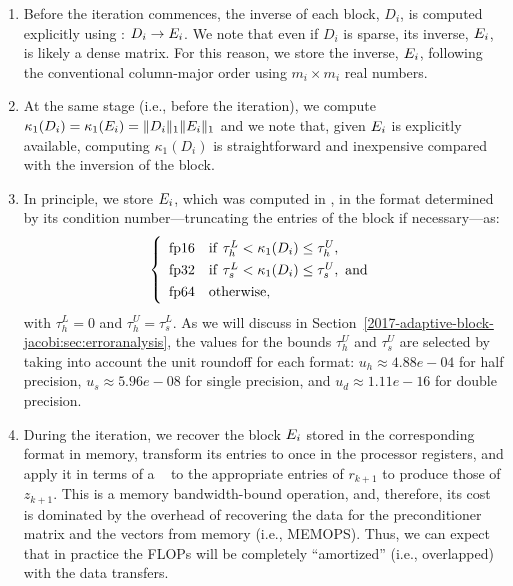 \begin{enumerate} 
	\item Before the iteration
	commences, the inverse of each block, $D_i$, is computed explicitly using 
	\fpd: 
	$D_i \rightarrow E_i$. We note that even if $D_i$ is
	sparse, its inverse, $E_i$, is likely a dense matrix. For this reason, we 
	store
	the inverse, $E_i$, following the conventional column-major order using
	$m_i\times m_i$ real numbers. 
	\item At the same stage (i.e., before the
	iteration),
	we compute $\kappa_1(D_i) = \kappa_1(E_i) =  \|D_{i}\|_1 \|E_{i}\|_1$
        and we note
	that, given $E_i$ is explicitly available, computing
	$\kappa_1(D_i)$ is straightforward and inexpensive compared with the
	inversion of the block. 
	\item In principle, we store $E_i$, which was computed in \fpd, in the
	format determined by its condition number---truncating the entries of the
	block if necessary---as: 
	\begin{equation} \label{2017-adaptive-block-jacobi:eqn:thresholds} \left\{
	\renewcommand{\arraystretch}{1.3} \begin{array}{l} \mathrm{\fph \quad
		if}~\tau_h^L < \kappa_1(D_i) \leq \tau_h^U,\\ \mathrm{\fps \quad
		if}~\tau_s^L < \kappa_1(D_i) \leq \tau_s^U,~\mathrm{and}\\ \mathrm{\fpd
		\quad otherwise}, \end{array} \right. 
	\end{equation} 
	with $\tau_h^L = 0$	and $\tau_h^U = \tau_s^L$. As we will discuss in 
	Section~\ref{2017-adaptive-block-jacobi:sec:erroranalysis}, the
	values for the bounds $\tau_h^U$ and $\tau_s^U$ are selected by taking into
	account the unit roundoff for each format: $u_h \approx 4.88e-04$ for half 
	precision, $u_s \approx 5.96e-08$ for 
	single precision, and $u_d\approx 1.11e-16$ for double precision. 
	\item During the iteration, we recover the block $E_i$ stored in the 
	corresponding
	format in memory, transform its entries to \fpd once in
	the processor registers, and apply it in terms of a \fpd~\gemv
	to the appropriate entries of $r_{k+1}$ to produce those of $z_{k+1}$.
	This is a memory bandwidth-bound operation, and, therefore, its cost is 
	dominated
	by the overhead of recovering the data for the preconditioner matrix and the
	vectors from memory (i.e., MEMOPS). Thus, we can expect that in
	practice the FLOPs will be completely ``amortized'' (i.e., overlapped) with
	the data transfers. 
\end{enumerate}

